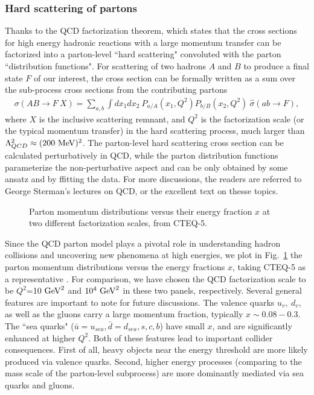 \documentclass[prd,aps,floats,preprintnumbers,preprint,superscriptaddress,floatfix,nofootinbib]{revtex4}
\def\mev{{\rm MeV}}
\def\gev{{\rm GeV}}
\def\bea{\begin{eqnarray}}
\def\eea{\end{eqnarray}}
\begin{document}
\subsubsection{Hard scattering of partons}
Thanks to the QCD factorization theorem,  which states that 
the cross sections for  high energy hadronic reactions with a large
momentum transfer can be factorized into a parton-level ``hard scattering"
convoluted with the parton ``distribution functions". 
For scattering of two hadrons $A$ and $B$ to produce a final state
$F$ of our interest, 
the cross section can be  formally written  as a sum over
the sub-process cross sections from the contributing partons
\bea
\sigma(AB\to F\ X) = \sum_{a,b} \int dx_1 dx_2\  P_{a/A}(x_1,Q^2)  P_{b/B}(x_2,Q^2)
\  \hat\sigma(ab \to F),
\label{eq:ab}
\eea
where $X$ is the inclusive scattering remnant, and 
$Q^2$ is the factorization scale (or the typical momentum transfer) 
in the hard scattering process, much  larger than 
$\Lambda_{QCD}^2\approx (200\  \mev)^2$.
The parton-level hard scattering cross section can be calculated 
perturbatively in QCD, while the parton distribution  functions 
parameterize the non-perturbative aspect and can be only
obtained by some ansatz and by ffitting the data. For more discussions,
the readers are referred to George Sterman's lectures \cite{george} on
QCD,  or the excellent text \cite{esw} on thesse topics.

\begin{center}
\begin{figure}[tb]
\caption{Parton momentum distributions versus their energy fraction $x$ at two
different factorization scales, from CTEQ-5. }
\label{fig:pdfs}
\end{figure}
\end{center}
 
Since the QCD parton model plays a pivotal role in understanding
hadron collisions and uncovering new phenomena at high energies,
we plot in Fig.~\ref{fig:pdfs} the parton momentum distributions 
versus the energy fractions $x$, taking CTEQ-5 as a 
representative \cite{cteq5}. 
For comparison, we have chosen the QCD factorization scale to be 
$Q^2$=10 $\gev^2$ and $10^4\ \gev^2$ in these two panels,
respectively.  Several general features are important
to note for future discussions. The valence quarks $u_v,\ d_v$,
as well as the gluons carry a large momentum fraction, typically
$x\sim 0.08 - 0.3$. The ``sea quarks" ($\bar u=u_{sea},
\bar d=d_{sea}, s,c,b$) have
small $x$, and are significantly enhanced at higher $Q^2$. Both
of these features lead to important collider consequences. First of
all, heavy objects near the energy threshold are more likely produced
via valence quarks. Second, higher energy processes (comparing to
the mass scale of the parton-level subprocess) are more dominantly
mediated via sea quarks and gluons.
\end{document}
